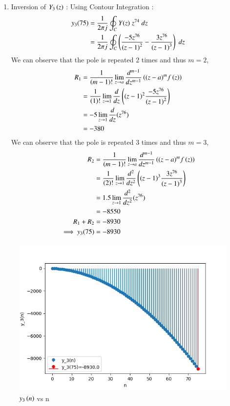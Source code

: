 \documentclass[journal,12pt,onecolumn]{IEEEtran}
\theoremstyle{remark}
\begin{document}
\begin{enumerate}[\brak{i}]
\begin{enumerate}[1.]
    \item
Inversion of $Y_3\left(z\right)$ :
Using Contour Integration :
\begin{align}
    y_3{(75)}&=\frac{1}{2\pi j}\oint_{C}Y(z) \;z^{74} \;dz  \\
    &=\frac{1}{2\pi j}\oint_{C}\left(\frac{-5z^{76}}{\left(z-1\right)^2}-
       \frac{3z^{76}}{\left(z-1\right)^3}\right) \;dz 
\end{align}
We can observe that the pole is repeated $2$ times and thus $m=2$,
\begin{align}
    R_1 &=\frac{1}{\left(m-1\right)!}\lim\limits_{z\to a}\frac{d^{m-1}}{dz^{m-1}}\left({(z-a)}^{m}f\left(z\right)\right)  \\
    &=\frac{1}{\left(1\right)!}\lim\limits_{z\to 1}\frac{d}{dz}\left({(z-1)}^{2}\frac{-5z^{76}}{{(z-1)}^2}\right)   \\
    &=-5\lim\limits_{z\to 1}\frac{d}{dz}(z^{76})   \\
    &= -380
        \end{align}
  We can observe that the pole is repeated $3$ times and thus $m=3$,
    \begin{align}
    R_2 &=\frac{1}{\left(m-1\right)!}\lim\limits_{z\to a}\frac{d^{m-1}}{dz^{m-1}}\left({(z-a)}^{m}f\left(z\right)\right)  \\
    &=\frac{1}{\left(2\right)!}\lim\limits_{z\to 1}\frac{d^{2}}{dz^{2}}\left({(z-1)}^{3}\frac{3z^{76}}{{(z-1)}^3}\right)   \\
    &=1.5\lim\limits_{z\to 1}\frac{d^2}{dz^2}(z^{76})   \\
    &= -8550\\
    R_1 + R_2 &= -8930\\
    \implies  y_3{(75)} &= -8930
\end{align}
    \end{enumerate}



\begin{figure}[!ht]   
\centering
\graphicspath{ {figs/} }
\includegraphics[width=12cm, height=8cm]{graph_3}
\caption{$y_3\left(n\right)$ vs n }\label{graph:ee25-g4}
\end{figure}
 \end{enumerate}
\end{document}
